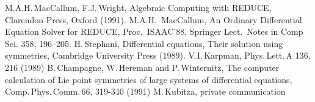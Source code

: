 \documentclass[12pt]{article}
\begin{document}
\begin{thebibliography}{99}
 M.A.H.\,MacCallum, F.J.\,Wright, Algebraic Computing with REDUCE,
Clarendon Press, Oxford (1991).
 M.A.H.\, MacCallum, An Ordinary Differential Equation
Solver for REDUCE, Proc.\, ISAAC'88, Springer Lect.\, Notes in Comp Sci.
358, 196--205.
 H.\,Stephani, Differential equations, Their solution using
symmetries, Cambridge University Press (1989).
 V.I.\,Karpman, Phys.\,Lett.\,A 136, 216 (1989)
 B.\,Champagne, W.\,Hereman and P.\,Winternitz, The computer
      calculation of Lie point symmetries of large systems of differential
      equations, Comp.\,Phys.\,Comm.\,66, 319-340 (1991)
 M.\,Kubitza, private communication

\end{thebibliography}
\end{document}
